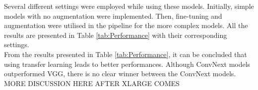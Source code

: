 \documentclass[11pt]{article}
\begin{document}
\begin{multicols}{2}
        Several different settings were employed while using these models. Initially, simple models with no augmentation were implemented. Then, fine-tuning and augmentation were utilised in the pipeline for the more complex models. All the results are presented in Table \ref{tab:Performance} with their corresponding settings. \\
        From the results presented in Table \ref{tab:Performance}, it can be concluded that using transfer learning leads to better performances. Although ConvNext models outperformed VGG, there is no clear winner between the ConvNext models.  \color{red} MORE DISCUSSION HERE AFTER XLARGE COMES \color{black} \\
        

\end{multicols}
\end{document}
